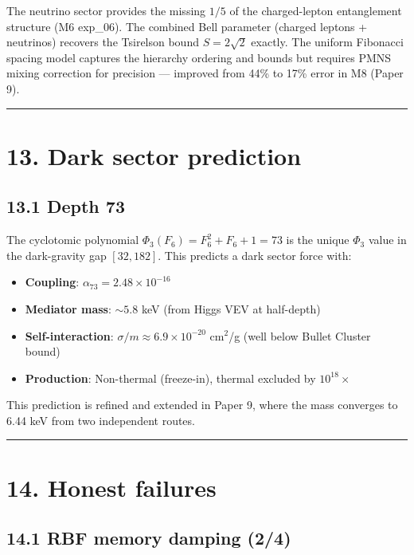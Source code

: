 \documentclass[11pt,a4paper]{article}
\providecommand{\tightlist}{\setlength{\itemsep}{0pt}\setlength{\parskip}{0pt}}
\begin{document}
The neutrino sector provides the missing $1/5$ of the charged-lepton entanglement structure (M6 exp\_06). The combined Bell parameter (charged leptons + neutrinos) recovers the Tsirelson bound $S = 2\sqrt{2}$ exactly. The uniform Fibonacci spacing model captures the hierarchy ordering and bounds but requires PMNS mixing correction for precision — improved from 44\% to 17\% error in M8 (Paper 9).

\begin{center}\rule{0.5\linewidth}{0.4pt}\end{center}

\section*{13. Dark sector prediction}

\subsection*{13.1 Depth 73}

The cyclotomic polynomial $\Phi_3(F_6) = F_6^2 + F_6 + 1 = 73$ is the unique $\Phi_3$ value in the dark-gravity gap $[32, 182]$. This predicts a dark sector force with:

\begin{itemize}\tightlist
\item \textbf{Coupling}: $\alpha_{73} = 2.48 \times 10^{-16}$
\item \textbf{Mediator mass}: $\sim 5.8$ keV (from Higgs VEV at half-depth)
\item \textbf{Self-interaction}: $\sigma/m \approx 6.9 \times 10^{-20}$ cm$^2$/g (well below Bullet Cluster bound)
\item \textbf{Production}: Non-thermal (freeze-in), thermal excluded by $10^{18}\times$
\end{itemize}

This prediction is refined and extended in Paper 9, where the mass converges to 6.44 keV from two independent routes.

\begin{center}\rule{0.5\linewidth}{0.4pt}\end{center}

\section*{14. Honest failures}

\subsection*{14.1 RBF memory damping (2/4)}
\end{document}
